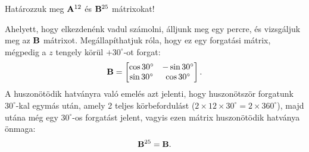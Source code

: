 \begin{exercise}{Határozzuk meg $\mathbf{A}^{12}$ és $\mathbf{B}^{25}$ mátrixokat!}
{  \tcbline

  Ahelyett, hogy elkezdenénk vadul számolni, álljunk meg egy percre, és
  vizsgáljuk meg az $\mathbf{B}$ mátrixot. Megállapíthatjuk róla, hogy ez egy
  forgatási mátrix, mégpedig a $z$ tengely körül $+30^\circ$-ot forgat:
  \[
    \mathbf{B} = \begin{bmatrix}
      \cos 30^\circ & - \sin 30^\circ \\
      \sin 30^\circ & \cos 30^\circ
    \end{bmatrix}
    \text.
  \]
  A huszonötödik hatványra való emelés azt jelenti, hogy huszonötször forgatunk
  $30^\circ$-kal egymás után, amely 2 teljes körbefordulást ($2 \times 12 \times
    30^\circ = 2 \times 360^\circ$), majd utána még egy $30^\circ$-os forgatást
  jelent, vagyis ezen mátrix huszonötödik hatványa önmaga:
  \[
    \mathbf{B}^{25} = \mathbf{B}
    \text.
  \]
  }
\end{exercise}
